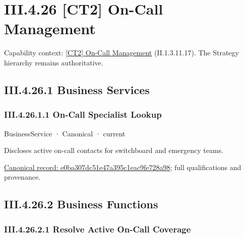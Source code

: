 \section*{III.4.26 [CT2] On-Call Management}
\label{navigation:III.4.26}

{\small Capability context: \hyperref[element:b16cef8f2bfd4b92948ec75cbcfa7b9a]{[CT2] On-Call Management} (II.1.3.11.17). The Strategy hierarchy remains authoritative.}\par
\subsection*{III.4.26.1 Business Services}
\label{navigation:III.4.26.1}

\subsubsection*{III.4.26.1.1 On-Call Specialist Lookup}
\label{navigation:III.4.26.1.1}

\label{element:e0ba307dc51e47a395c1eac9fe728a98}
{\small BusinessService · Canonical · current}\par

Discloses active on-call contacts for switchboard and emergency teams.


{\footnotesize \href{../../../../continuum/business/business-service/e0ba307dc51e47a395c1eac9fe728a98.md}{Canonical record: e0ba307dc51e47a395c1eac9fe728a98}; full qualifications and provenance.}\par
\subsection*{III.4.26.2 Business Functions}
\label{navigation:III.4.26.2}

\subsubsection*{III.4.26.2.1 Resolve Active On-Call Coverage}
\label{navigation:III.4.26.2.1}

